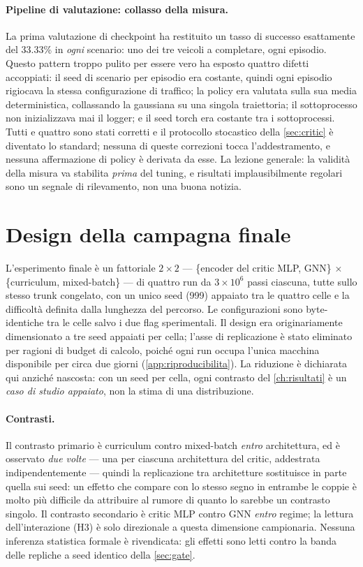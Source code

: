 \paragraph{Pipeline di valutazione: collasso della misura.}
La prima valutazione di checkpoint ha restituito un tasso di successo
esattamente del 33.33\% in \emph{ogni} scenario: uno dei tre veicoli a
completare, ogni episodio. Questo pattern troppo pulito per essere vero
ha esposto quattro difetti accoppiati: il seed di scenario per episodio
era costante, quindi ogni episodio rigiocava la stessa configurazione di
traffico; la policy era valutata sulla sua media deterministica,
collassando la gaussiana su una singola traiettoria; il sottoprocesso
non inizializzava mai il logger; e il seed torch era costante tra i
sottoprocessi. Tutti e quattro sono stati corretti e il protocollo
stocastico della \cref{sec:critic} è diventato lo standard; nessuna di
queste correzioni tocca l'addestramento, e nessuna affermazione di
policy è derivata da esse. La lezione generale: la validità della misura
va stabilita \emph{prima} del tuning, e risultati implausibilmente
regolari sono un segnale di rilevamento, non una buona notizia.

\section{Design della campagna finale}
\label{sec:campagna}

L'esperimento finale è un fattoriale $2 \times 2$ --- \{encoder del
critic MLP, GNN\} $\times$ \{curriculum, mixed-batch\} --- di quattro
run da $3\times10^{6}$ passi ciascuna, tutte sullo stesso trunk
congelato, con un unico seed (999) appaiato tra le quattro celle e la
difficoltà definita dalla lunghezza del percorso. Le configurazioni sono
byte-identiche tra le celle salvo i due flag sperimentali. Il design era
originariamente dimensionato a tre seed appaiati per cella; l'asse di
replicazione è stato eliminato per ragioni di budget di calcolo, poiché
ogni run occupa l'unica macchina disponibile per circa due giorni
(\cref{app:riproducibilita}). La riduzione è dichiarata qui anziché
nascosta: con un seed per cella, ogni contrasto del \cref{ch:risultati}
è un \emph{caso di studio appaiato}, non la stima di una distribuzione.

\paragraph{Contrasti.}
Il contrasto primario è curriculum contro mixed-batch \emph{entro}
architettura, ed è osservato \emph{due volte} --- una per ciascuna
architettura del critic, addestrata indipendentemente --- quindi la
replicazione tra architetture sostituisce in parte quella sui seed: un
effetto che compare con lo stesso segno in entrambe le coppie è molto
più difficile da attribuire al rumore di quanto lo sarebbe un contrasto
singolo. Il contrasto secondario è critic MLP contro GNN \emph{entro}
regime; la lettura dell'interazione (H3) è solo direzionale a questa
dimensione campionaria. Nessuna inferenza statistica formale è
rivendicata: gli effetti sono letti contro la banda delle repliche a
seed identico della \cref{sec:gate}.

